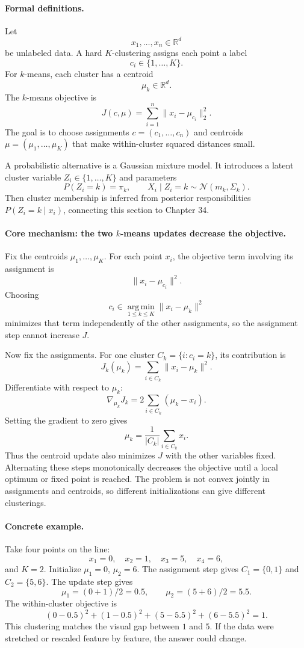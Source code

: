 \paragraph{Formal definitions.}
Let
\[
x_1,\ldots,x_n\in\mathbb R^d
\]
be unlabeled data. A hard \(K\)-clustering assigns each point a label
\[
c_i\in\{1,\ldots,K\}.
\]
For \(k\)-means, each cluster has a centroid
\[
\mu_k\in\mathbb R^d.
\]
The \(k\)-means objective is
\[
\boxed{
J(c,\mu)=\sum_{i=1}^n \|x_i-\mu_{c_i}\|_2^2.
}
\]
The goal is to choose assignments \(c=(c_1,\ldots,c_n)\) and centroids \(\mu=(\mu_1,\ldots,\mu_K)\) that make within-cluster squared distances small.

A probabilistic alternative is a Gaussian mixture model. It introduces a latent cluster variable \(Z_i\in\{1,\ldots,K\}\) and parameters
\[
P(Z_i=k)=\pi_k,\qquad X_i\mid Z_i=k\sim\mathcal N(m_k,\Sigma_k).
\]
Then cluster membership is inferred from posterior responsibilities \(P(Z_i=k\mid x_i)\), connecting this section to Chapter 34.

\paragraph{Core mechanism: the two \(k\)-means updates decrease the objective.}
Fix the centroids \(\mu_1,\ldots,\mu_K\). For each point \(x_i\), the objective term involving its assignment is
\[
\|x_i-\mu_{c_i}\|^2.
\]
Choosing
\[
c_i\in\operatorname*{arg\,min}_{1\leq k\leq K}\|x_i-\mu_k\|^2
\]
minimizes that term independently of the other assignments, so the assignment step cannot increase \(J\).

Now fix the assignments. For one cluster \(C_k=\{i:c_i=k\}\), its contribution is
\[
J_k(\mu_k)=\sum_{i\in C_k}\|x_i-\mu_k\|^2.
\]
Differentiate with respect to \(\mu_k\):
\[
\nabla_{\mu_k}J_k=2\sum_{i\in C_k}(\mu_k-x_i).
\]
Setting the gradient to zero gives
\[
\boxed{
\mu_k=\frac{1}{|C_k|}\sum_{i\in C_k}x_i.
}
\]
Thus the centroid update also minimizes \(J\) with the other variables fixed. Alternating these steps monotonically decreases the objective until a local optimum or fixed point is reached. The problem is not convex jointly in assignments and centroids, so different initializations can give different clusterings.

\paragraph{Concrete example.}
Take four points on the line:
\[
x_1=0,\quad x_2=1,\quad x_3=5,\quad x_4=6,
\]
and \(K=2\). Initialize \(\mu_1=0\), \(\mu_2=6\). The assignment step gives \(C_1=\{0,1\}\) and \(C_2=\{5,6\}\). The update step gives
\[
\mu_1=(0+1)/2=0.5,\qquad \mu_2=(5+6)/2=5.5.
\]
The within-cluster objective is
\[
(0-0.5)^2+(1-0.5)^2+(5-5.5)^2+(6-5.5)^2=1.
\]
This clustering matches the visual gap between \(1\) and \(5\). If the data were stretched or rescaled feature by feature, the answer could change.

